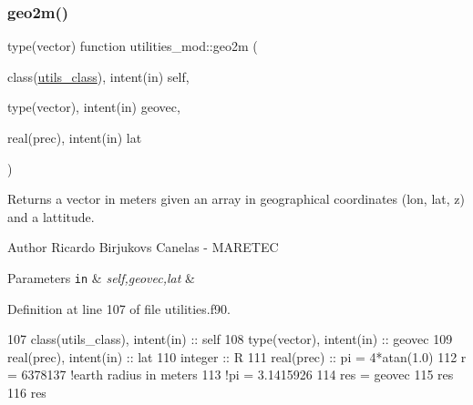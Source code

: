\subsubsection{\texorpdfstring{geo2m()}{geo2m()}}
{\footnotesize\ttfamily type(vector) function utilities\+\_\+mod\+::geo2m (\begin{DoxyParamCaption}\item[{class(\mbox{\hyperlink{structutilities__mod_1_1utils__class}{utils\+\_\+class}}), intent(in)}]{self,  }\item[{type(vector), intent(in)}]{geovec,  }\item[{real(prec), intent(in)}]{lat }\end{DoxyParamCaption})\hspace{0.3cm}{\ttfamily [private]}}



Returns a vector in meters given an array in geographical coordinates (lon, lat, z) and a lattitude. 

\begin{DoxyAuthor}{Author}
Ricardo Birjukovs Canelas -\/ M\+A\+R\+E\+T\+EC 
\end{DoxyAuthor}

\begin{DoxyParams}[1]{Parameters}
\mbox{\tt in}  & {\em self,geovec,lat} & \\
\hline
\end{DoxyParams}


Definition at line 107 of file utilities.\+f90.


\begin{DoxyCode}
107     \textcolor{keywordtype}{class}(utils\_class), \textcolor{keywordtype}{intent(in)} :: self
108     \textcolor{keywordtype}{type}(vector), \textcolor{keywordtype}{intent(in)} :: geovec
109     \textcolor{keywordtype}{real(prec)}, \textcolor{keywordtype}{intent(in)} :: lat
110     \textcolor{keywordtype}{integer} :: R
111     \textcolor{keywordtype}{real(prec)} :: pi = 4*atan(1.0)
112     r = 6378137 \textcolor{comment}{!earth radius in meters}
113     \textcolor{comment}{!pi = 3.1415926}
114     res = geovec
115     res%
116     res%
\end{DoxyCode}
\mbox{\label{namespaceutilities__mod_a164054d89c012d95f63c12a6cc0ac8d7}} 
